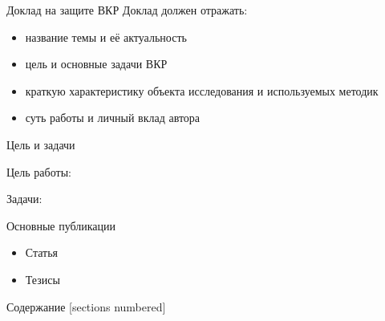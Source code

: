 \begin{frame}
  \setcounter{framenumber}{1}
  \maketitle
\end{frame}

\begin{frame}{Доклад на защите ВКР}
  Доклад должен отражать:
  \begin{itemize}
    \item название темы и её актуальность
    \item цель и основные задачи ВКР
    \item краткую характеристику объекта исследования и используемых методик
    \item суть работы и личный вклад автора
  \end{itemize}
\end{frame}

\begin{frame}[t]{Цель и задачи}
  \begin{block}{Цель работы:}\vspace{0pt}
    \aim
  \end{block}

  \medskip
  \begin{block}{Задачи:}\vspace{0pt}
    \tasks
  \end{block}
\end{frame}

\begin{frame}{Основные публикации}

  \begin{itemize}
    \item Статья
    \item Тезисы
  \end{itemize}
%
\end{frame}


\begin{frame}{Содержание}
  [sections numbered]
  \tableofcontents[hideallsubsections]
\end{frame}
